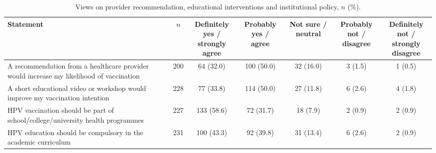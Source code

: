\begin{table}[htbp]\centering\scriptsize
\caption{Views on provider recommendation, educational interventions and institutional policy, $n$ (\%).}\label{tab:support}
\setlength{\tabcolsep}{3pt}
\begin{tabularx}{\textwidth}{@{}>{\raggedright\arraybackslash}X c c c c c c@{}}\toprule
Statement & $n$ & \shortstack{Definitely yes /\\strongly agree} & \shortstack{Probably yes /\\agree} & Not sure / neutral & \shortstack{Probably not /\\disagree} & \shortstack{Definitely not /\\strongly disagree} \\\midrule
A recommendation from a healthcare provider would increase my likelihood of vaccination & 200 & 64 (32.0) & 100 (50.0) & 32 (16.0) & 3 (1.5) & 1 (0.5) \\
A short educational video or workshop would improve my vaccination intention & 228 & 77 (33.8) & 114 (50.0) & 27 (11.8) & 6 (2.6) & 4 (1.8) \\
HPV vaccination should be part of school/college/university health programmes & 227 & 133 (58.6) & 72 (31.7) & 18 (7.9) & 2 (0.9) & 2 (0.9) \\
HPV education should be compulsory in the academic curriculum & 231 & 100 (43.3) & 92 (39.8) & 31 (13.4) & 6 (2.6) & 2 (0.9) \\
\bottomrule\end{tabularx}\end{table}
